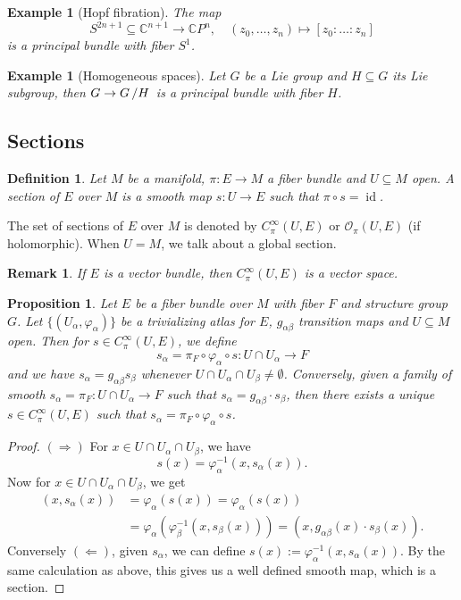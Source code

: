 \documentclass[10pt, a4paper]{article}
\newtheorem{proposition}[thm]{Proposition}
\newtheorem{defi}[thm]{Definition}
\newenvironment{noticeB}{%
  \tcolorbox[%
  notitle,
  empty,
  enhanced,  %
  breakable,
  coltext=black,
  colback=white, 
  fontupper=\rmfamily,
  noparskip,
  sharp corners,
  boxrule=-1pt,  %
  frame hidden,
  left=7pt,  %
  right=7pt,
  top=5pt,
  bottom=5pt,
  before skip=2.5ex plus 2pt,
  after skip=2.5ex plus 2pt,
  borderline west = {1.5pt}{-0.1pt}{blue!30!black}, %
  overlay unbroken and last={%
    \draw[color=black, line width=1.25pt]
    ($(frame.south west)+(1.pt, -0.1pt)$) -- ++(2em, 0);
  }
  ]}
{\endtcolorbox}
\newenvironment{definition}{\begin{noticeB}\begin{defi}}{%
    \end{defi}\end{noticeB}}
\newtheorem*{remark}{Remark}
\newtheorem{example}[thm]{Example}
\newenvironment{noticeC}{%
  \tcolorbox[%
  notitle,
  empty,
  enhanced,  %
  breakable,
  coltext=black, 
  fontupper=\rmfamily,
  noparskip,
  sharp corners,
  boxrule=-1pt,  %
  frame hidden,
  left=7pt,  %
  right=7pt,
  top=5pt,
  bottom=5pt,
  before skip=2.5ex plus 2pt,
  after skip=2.5ex plus 2pt,
  overlay unbroken and last={%
  },
  ]}
{\endtcolorbox}
\newenvironment{myproof}%
  {\begin{noticeC}\begin{proof}}%
  {\end{proof}\end{noticeC}}
\newcommand{\C}{\mathbb {C}}
\newcommand{\quot}[2]{{\raisebox{0em}{$#1$}\left/\raisebox{0em}{$#2$}\right.}}
\DeclareMathOperator{\id}{id}
\begin{document}
\begin{example}[Hopf fibration]
  The map $$S^{2n + 1} \subseteq \C^{n + 1} \to \C P^{n},\quad (z_0, \dots, z_n) \mapsto [z_0: \dots : z_n]$$
  is a principal bundle with fiber $S^1$.
\end{example}

\begin{example}[Homogeneous spaces]
  Let $G$ be a Lie group and $H \subseteq G$ its Lie subgroup, then $G \to \quot{G}{H}$ is a principal bundle with fiber $H$.
\end{example}

\subsection{Sections}


\begin{definition}
  Let $M$ be a manifold, $\pi: E \to M$ a fiber bundle and $U \subseteq M$ open.
  A section of $E$ over $M$ is a smooth map $s: U \to E$ such that $\pi \circ s = \id$.
\end{definition}

The set of sections of $E$ over $M$ is denoted by $C_\pi ^\infty (U, E)$ or $\mathcal{O}_\pi (U, E)$ (if holomorphic).
When $U = M$, we talk about a global section.

\begin{remark}
  If $E$ is a vector bundle, then $C_\pi ^\infty (U, E)$ is a vector space.
\end{remark}

\begin{proposition}
  Let $E$ be a fiber bundle over $M$ with fiber $F$ and structure group $G$.
  Let $\{(U_\alpha, \varphi_\alpha)\}$ be a trivializing atlas for $E$, $g_{\alpha \beta}$ transition maps and $U \subseteq M$ open.
  Then for $s \in C^\infty _\pi (U, E)$, we define 
  $$s_\alpha = \pi_F \circ \varphi_\alpha \circ s: U \cap U_\alpha \to F$$
  and we have $s_\alpha = g_{\alpha \beta} s_\beta$ whenever $U \cap U_\alpha \cap U_\beta \neq \emptyset$.
  Conversely, given a family of smooth $s_\alpha = \pi_F: U \cap U_\alpha \to F$ such that $s_\alpha = g_{\alpha \beta} \cdot s_\beta$,
  then there exists a unique $s \in C_\pi ^\infty (U, E)$ such that $s_\alpha = \pi_F \circ \varphi_\alpha \circ s$.
\end{proposition}

\begin{myproof}
  $(\Rightarrow)$ For $x \in U \cap U_\alpha \cap U_\beta$, we have 
  $$s(x) = \varphi_\alpha ^{-1} (x, s_\alpha (x)).$$
  Now for $x \in U \cap U_\alpha \cap U_\beta$, we get 
  \begin{align*}
    (x, s_\alpha (x)) &= \varphi_\alpha (s(x)) = \varphi_\alpha (s(x))\\
    &= \varphi_\alpha (\varphi_\beta ^{-1} (x, s_\beta (x))) = (x, g_{\alpha \beta} (x) \cdot s_\beta (x)).
  \end{align*}
  Conversely $(\Leftarrow)$, given $s_\alpha$, we can define $s(x) := \varphi_\alpha^{-1} (x, s_\alpha (x))$.
  By the same calculation as above, this gives us a well defined smooth map, which is a section.
\end{myproof}
\end{document}
